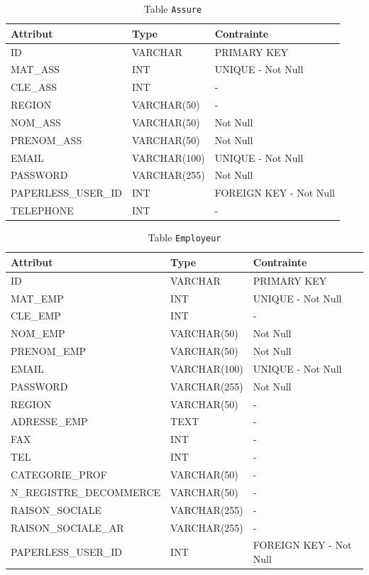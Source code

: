 \begin{table}[h!]
\centering
\begin{tabular}{|l|l|l|}
\hline
\textbf{Attribut} & \textbf{Type} & \textbf{Contrainte} \\
\hline
ID & VARCHAR & PRIMARY KEY \\
MAT\_ASS & INT & UNIQUE - Not Null \\
CLE\_ASS & INT & - \\
REGION & VARCHAR(50) & - \\
NOM\_ASS & VARCHAR(50) & Not Null \\
PRENOM\_ASS & VARCHAR(50) & Not Null \\
EMAIL & VARCHAR(100) & UNIQUE - Not Null \\
PASSWORD & VARCHAR(255) & Not Null \\
PAPERLESS\_USER\_ID & INT & FOREIGN KEY - Not Null \\
TELEPHONE & INT & - \\
\hline
\end{tabular}
\caption{Table \texttt{Assure}}
\end{table}
\begin{table}[h!]
\centering
\begin{tabular}{|l|l|l|}
\hline
\textbf{Attribut} & \textbf{Type} & \textbf{Contrainte} \\
\hline
ID & VARCHAR & PRIMARY KEY \\
MAT\_EMP & INT & UNIQUE - Not Null \\
CLE\_EMP & INT & - \\
NOM\_EMP & VARCHAR(50) & Not Null \\
PRENOM\_EMP & VARCHAR(50) & Not Null \\
EMAIL & VARCHAR(100) & UNIQUE - Not Null \\
PASSWORD & VARCHAR(255) & Not Null \\
REGION & VARCHAR(50) & - \\
ADRESSE\_EMP & TEXT & - \\
FAX & INT & - \\
TEL & INT & - \\
CATEGORIE\_PROF & VARCHAR(50) & - \\
N\_REGISTRE\_DECOMMERCE & VARCHAR(50) & - \\
RAISON\_SOCIALE & VARCHAR(255) & - \\
RAISON\_SOCIALE\_AR & VARCHAR(255) & - \\
PAPERLESS\_USER\_ID & INT & FOREIGN KEY - Not Null \\
\hline
\end{tabular}
\caption{Table \texttt{Employeur}}
\end{table}
\clearpage
